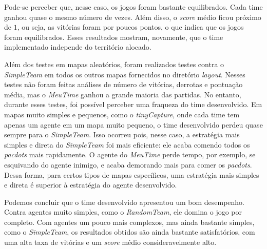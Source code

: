 \documentclass[a4paper,12pt]{article}
\begin{document}
Pode-se perceber que, nesse caso, os jogos foram bastante equilibrados. Cada time ganhou quase o mesmo
número de vezes. Além disso, o \textit{score} médio ficou próximo de $1$, ou seja, as vitórias foram
por poucos pontos, o que indica que os jogos foram equilibrados. Esses resultados mostram, novamente,
que o time implementado independe do território alocado.

Além dos testes em mapas aleatórios, foram realizados testes contra o \textit{SimpleTeam} em
todos os outros mapas fornecidos no diretório \textit{layout}. Nesses testes não foram feitas
análises de número de vitórias, derrotas e pontuação média, mas o \textit{MeuTime} ganhou a grande
maioria das partidas. No entanto, durante esses testes, foi possível perceber uma fraqueza
do time desenvolvido. Em mapas muito simples e pequenos, como o \textit{tinyCapture}, onde cada
time tem apenas um agente em um mapa muito pequeno, o time desenvolvido perdeu quase sempre para
o \textit{SimpleTeam}. Isso ocorreu pois, nesse caso, a estratégia mais simples e direta do
\textit{SimpleTeam} foi mais eficiente: ele acaba comendo todos os \textit{pacdots} mais rapidamente.
O agente do \textit{MeuTime} perde tempo, por exemplo, se esquivando do agente inimigo, e acaba
demorando mais para comer os \textit{pacdots}. Dessa forma, para certos tipos de mapas específicos,
uma estratégia mais simples e direta é superior à estratégia do agente desenvolvido.

Podemos concluir que o time desenvolvido apresentou um bom desempenho. Contra agentes muito simples,
como o \textit{RandomTeam}, ele domina o jogo por completo. Com agentes um pouco mais complexos,
mas ainda bastante simples, como o \textit{SimpleTeam}, os resultados obtidos são ainda bastante
satisfatórios, com uma alta taxa de vitórias e um \textit{score} médio consideravelmente alto.
\end{document}
